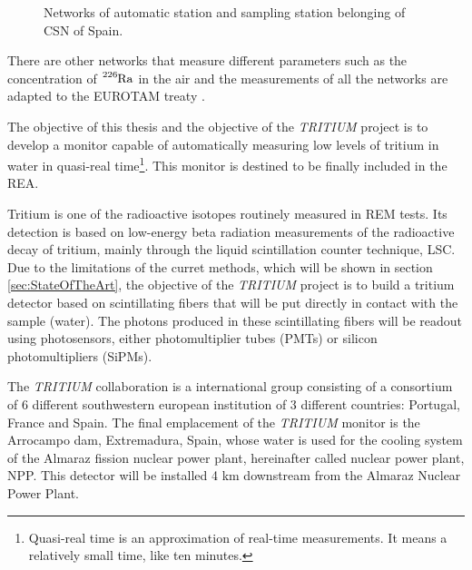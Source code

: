 \begin{figure}[hbtp]
 \centering
 \caption{Networks of automatic station and sampling station belonging of CSN of Spain.}
 \label{fig:NetworksCSN}
\end{figure}

There are other networks that measure different parameters such as the concentration of $\ce{^{226}Ra}$ in the air and the measurements of all the networks are adapted to the EUROTAM treaty \cite{100BqL}.

The objective of this thesis and the objective of the \textit{TRITIUM} project is to develop a monitor capable of automatically measuring low levels of tritium in water in quasi-real time\footnote{Quasi-real time is an approximation of real-time measurements. It means a relatively small time, like ten minutes.}. This monitor is destined to be finally included in the REA.

Tritium is one of the radioactive isotopes routinely measured in REM tests. Its detection is based on low-energy beta radiation measurements of the radioactive decay of tritium, mainly through the liquid scintillation counter technique, LSC. Due to the limitations of the curret methods, which will be shown in section \ref{sec:StateOfTheArt}, the objective of the \textit{TRITIUM} project is to build a tritium detector based on scintillating fibers that will be put directly in contact with the sample (water). The photons produced in these scintillating fibers will be readout using photosensors, either photomultiplier tubes (PMTs) or silicon photomultipliers (SiPMs). 

The \textit{TRITIUM} collaboration is a international group consisting of a consortium of 6 different southwestern european institution of 3 different countries: Portugal, France and Spain. The final emplacement of the \textit{TRITIUM} monitor is the Arrocampo dam, Extremadura, Spain, whose water is used for the cooling system of the Almaraz fission nuclear power plant, hereinafter called nuclear power plant, NPP. This detector will be installed 4 km downstream from the Almaraz Nuclear Power Plant.

